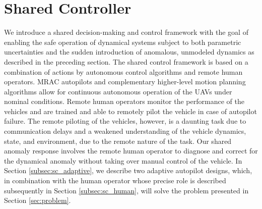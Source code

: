 \documentclass[english]{ifacconf}
\begin{document}
\section{Shared Controller}\label{sec:shared_ctrl}
We introduce a shared decision-making and control framework with the goal of enabling the safe operation of dynamical systems subject to both parametric uncertainties and the sudden introduction of anomalous, unmodeled dynamics as described in the preceding section. The shared control framework is based on a combination of actions by autonomous control algorithms and remote human operators. MRAC autopilots and complementary higher-level motion planning algorithms allow for continuous autonomous operation of the UAVs under nominal conditions. Remote human operators monitor the performance of the vehicles and are trained and able to remotely pilot the vehicle in case of autopilot failure. The remote piloting of the vehicles, however, is a daunting task due to communication delays and a weakened understanding of the vehicle dynamics, state, and environment, due to the remote nature of the task. Our shared anomaly response involves the remote human operator to diagnose and correct for the dynamical anomaly without taking over manual control of the vehicle. In Section \ref{subsec:sc_adaptive}, we describe two adaptive autopilot designs, which, in combination with the human operator whose precise role is described subsequently in Section \ref{subsec:sc_human}, will solve the problem presented in Section \ref{sec:problem}.
\end{document}
